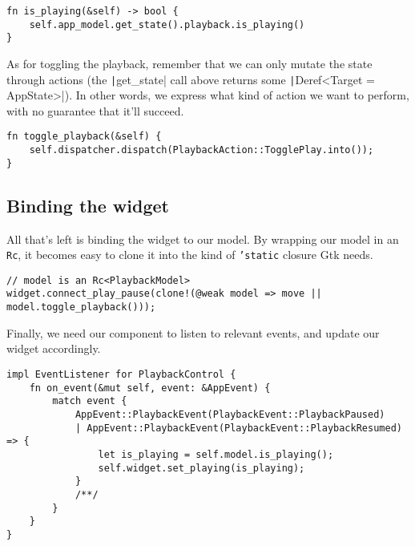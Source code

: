 \documentclass[12pt, a4paper]{article}
\begin{document}
\begin{verbatim}
fn is_playing(&self) -> bool {
    self.app_model.get_state().playback.is_playing()
}
\end{verbatim}

As for toggling the playback, remember that we can only mutate the state through actions (the \texttt|get_state| call above returns some \texttt|Deref<Target = AppState>|). In other words, we express what kind of action we want to perform, with no guarantee that it'll succeed.

\begin{verbatim}
fn toggle_playback(&self) {
    self.dispatcher.dispatch(PlaybackAction::TogglePlay.into());
}
\end{verbatim}

\subsection{Binding the widget}

All that's left is binding the widget to our model. By wrapping our model in an \texttt{Rc}, it becomes easy to clone it into the kind of \texttt{'static} closure Gtk needs.

\begin{verbatim}
// model is an Rc<PlaybackModel>
widget.connect_play_pause(clone!(@weak model => move || model.toggle_playback()));
\end{verbatim}

Finally, we need our component to listen to relevant events, and update our widget accordingly.

\begin{verbatim}
impl EventListener for PlaybackControl {
    fn on_event(&mut self, event: &AppEvent) {
        match event {
            AppEvent::PlaybackEvent(PlaybackEvent::PlaybackPaused)
            | AppEvent::PlaybackEvent(PlaybackEvent::PlaybackResumed) => {
                let is_playing = self.model.is_playing();
                self.widget.set_playing(is_playing);
            }
            /**/
        }
    }
}
\end{verbatim}
\end{document}
